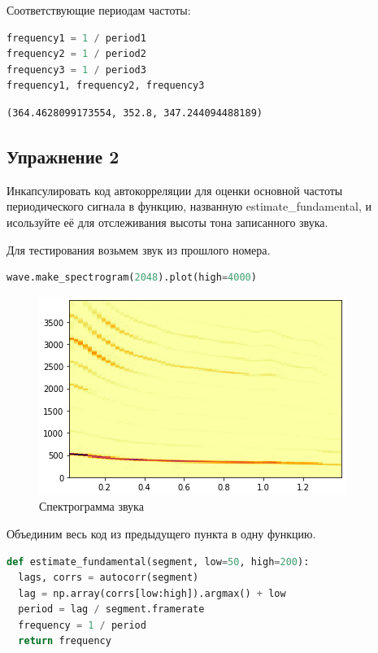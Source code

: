 Соответствующие периодам частоты:

\begin{lstlisting}[language=Python]
frequency1 = 1 / period1
frequency2 = 1 / period2
frequency3 = 1 / period3
frequency1, frequency2, frequency3
\end{lstlisting}
\begin{lstlisting}
(364.4628099173554, 352.8, 347.244094488189)
\end{lstlisting}

\subsection{Упражнение 2}
Инкапсулировать код автокорреляции для оценки основной частоты периодического сигнала в функцию, названную estimate\_fundamental, и исользуйте её для отслеживания высоты тона записанного звука.

Для тестирования возьмем звук из прошлого номера.

\begin{lstlisting}[language=Python]
wave.make_spectrogram(2048).plot(high=4000)
\end{lstlisting}
\begin{figure}[H]
	\begin{center}
		\includegraphics[scale=1]{fig/lab05/lab5_3.png}
		\caption{Спектрограмма звука}
	\end{center}
\end{figure}

Объединим весь код из предыдущего пункта в одну функцию.

\begin{lstlisting}[language=Python]
def estimate_fundamental(segment, low=50, high=200):
  lags, corrs = autocorr(segment)
  lag = np.array(corrs[low:high]).argmax() + low
  period = lag / segment.framerate
  frequency = 1 / period
  return frequency
\end{lstlisting}

